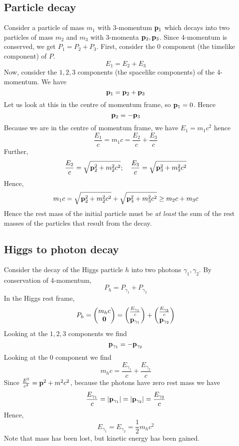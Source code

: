 \subsection{Particle decay}
Consider a particle of mass \(m_1\) with 3-momentum \(\vb p_1\) which decays into two particles of mass \(m_2\) and \(m_3\) with 3-momenta \(\vb p_2, \vb p_3\).
Since 4-momentum is conserved, we get \(P_1 = P_2 + P_3\).
First, consider the 0 component (the timelike component) of \(P\).
\[
	E_1 = E_2 + E_3
\]
Now, consider the \(1, 2, 3\) components (the spacelike components) of the 4-momentum.
We have
\[
	\vb p_1 = \vb p_2 + \vb p_3
\]
Let us look at this in the centre of momentum frame, so \(\vb p_1 = 0\).
Hence
\[
	\vb p_2 = -\vb p_3
\]
Because we are in the centre of momentum frame, we have \(E_1 = m_1 c^2\) hence
\[
	\frac{E_1}{c} = m_1 c = \frac{E_2}{c} + \frac{E_3}{c}
\]
Further,
\[
	\frac{E_2}{c} = \sqrt{\vb p_2^2 + m_2^2 c^2};\quad \frac{E_3}{c} = \sqrt{\vb p_3^2 + m_3^2 c^2}
\]
Hence,
\[
	m_1 c = \sqrt{\vb p_2^2 + m_2^2 c^2} + \sqrt{\vb p_3^2 + m_3^2 c^2} \geq m_2 c + m_3 c
\]
Hence the rest mass of the initial particle must be \textit{at least} the sum of the rest masses of the particles that result from the decay.

\subsection{Higgs to photon decay}
Consider the decay of the Higgs particle \(h\) into two photons \(\gamma_1, \gamma_2\).
By conservation of 4-momentum,
\[
	P_h = P_{\gamma_1} + P_{\gamma_2}
\]
In the Higgs rest frame,
\[
	P_h = \begin{pmatrix}
		m_h c \\ \vb 0
	\end{pmatrix} =
	\begin{pmatrix}
		\frac{E_{\gamma_1}}{c} \\ \vb p_{\gamma_1}
	\end{pmatrix}
	+
	\begin{pmatrix}
		\frac{E_{\gamma_2}}{c} \\ \vb p_{\gamma_2}
	\end{pmatrix}
\]
Looking at the \(1, 2, 3\) components we find
\[
	\vb p_{\gamma_1} = -\vb p_{\gamma_2}
\]
Looking at the 0 component we find
\[
	m_h c = \frac{E_{\gamma_1}}{c} + \frac{E_{\gamma_2}}{c}
\]
Since \(\frac{E^2}{c^2} = \vb p^2 + m^2c^2\), because the photons have zero rest mass we have
\[
	\frac{E_{\gamma_1}}{c} = \abs{\vb p_{\gamma_1}} = \abs{\vb p_{\gamma_2}} = \frac{E_{\gamma_2}}{c}
\]
Hence,
\[
	E_{\gamma_1} = E_{\gamma_2} = \frac{1}{2}m_h c^2
\]
Note that mass has been lost, but kinetic energy has been gained.

